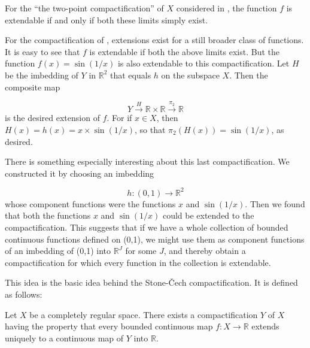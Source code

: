 For the ``the two-point compactification'' of \(X\) considered in , the function \(f\) is extendable if and only if both these limits simply exist.

For the compactification of , extensions exist for a still broader class of functions. It is easy to see that \(f\) is extendable if both the above limits exist. But the function \(f(x) = \sin ( {1/x})\) is also extendable to this compactification. Let \(H\) be the imbedding of \(Y\) in \(\mathbb{R}^{2}\) that equals \(h\) on the subspace \(X\). Then the composite map

\[
Y\overset{H}{ \rightarrow }\mathbb{R} \times \mathbb{R}\overset{{\pi }_{2}}{ \rightarrow }\mathbb{R}
\]
is the desired extension of \(f\). For if \(x \in X\), then \(H(x) = h(x) = x \times \sin ( {1/x})\), so that \({\pi }_{2}( {H(x) }) = \sin ( {1/x})\), as desired.

There is something especially interesting about this last compactification. We constructed it by choosing an imbedding

\[
h : ( {0,1}) \rightarrow {\mathbb{R}}^{2}
\]
whose component functions were the functions \(x\) and \(\sin ( {1/x})\). Then we found that both the functions \(x\) and \(\sin ( {1/x})\) could be extended to the compactification. This suggests that if we have a whole collection of bounded continuous functions defined on (0,1), we might use them as component functions of an imbedding of (0,1) into \(\mathbb{R}^{J}\) for some \(J\), and thereby obtain a compactification for which every function in the collection is extendable.

This idea is the basic idea behind the Stone-Čech compactification. It is defined as follows:

\begin{theorem}
\label{thm:\thetheorem}
 Let \(X\) be a completely regular space. There exists a compactification \(Y\) of \(X\) having the property that every bounded continuous map \(f : X \rightarrow \mathbb{R}\) extends uniquely to a continuous map of \(Y\) into \(\mathbb{R}\).
\end{theorem}

